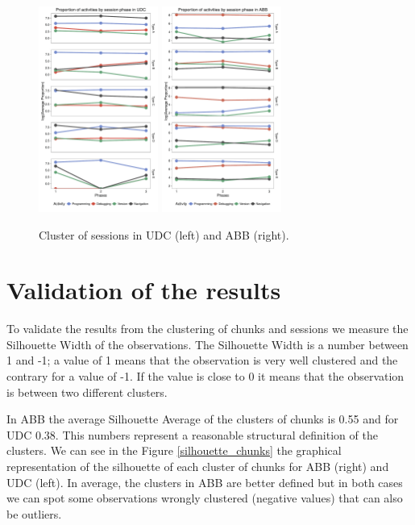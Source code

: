 \documentclass[conference]{IEEEtran}
\begin{document}
\begin{figure}[!ht]
	
	\centering
	\includegraphics[width=0.35\textwidth]{Figures/UDC_phases_log}
	\includegraphics[width=0.35\textwidth]{Figures/ABB_phases_log}
	
	\caption{Cluster of sessions in UDC (left) and ABB (right).}
	\label{ABB_phases}
\end{figure}

\section{Validation of the results}
To validate the results from the clustering of chunks and sessions we measure the Silhouette Width of the observations. The Silhouette Width is a number between 1 and -1; a value of 1 means that the observation is very well clustered and the contrary for a value of -1. If the value is close to 0 it means that the observation is between two different clusters.

In ABB the average Silhouette Average of the clusters of chunks is 0.55 and for UDC 0.38. This numbers represent a reasonable structural definition of the clusters. We can see in the Figure \ref{silhouette_chunks} the graphical representation of the silhouette of each cluster of chunks for ABB (right) and UDC (left). In average, the clusters in ABB are better defined but in both cases we can spot some observations wrongly clustered (negative values) that can also be outliers.
\end{document}
